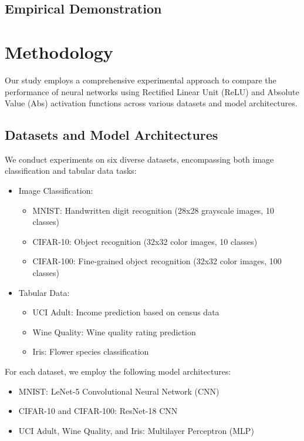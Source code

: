 \documentclass[11pt]{article}
\begin{document}
\subsection{Empirical Demonstration}



\section{Methodology}

Our study employs a comprehensive experimental approach to compare the performance of neural networks using Rectified Linear Unit (ReLU) and Absolute Value (Abs) activation functions across various datasets and model architectures.

\subsection{Datasets and Model Architectures}
We conduct experiments on six diverse datasets, encompassing both image classification and tabular data tasks:

\begin{itemize}
\item Image Classification:

\begin{itemize}
\item MNIST: Handwritten digit recognition (28x28 grayscale images, 10 classes)
\item CIFAR-10: Object recognition (32x32 color images, 10 classes)
\item CIFAR-100: Fine-grained object recognition (32x32 color images, 100 classes)
\end{itemize}

\item Tabular Data:

\begin{itemize}
\item UCI Adult: Income prediction based on census data
\item Wine Quality: Wine quality rating prediction
\item Iris: Flower species classification
\end{itemize}

\end{itemize}

For each dataset, we employ the following model architectures:

\begin{itemize}
\item MNIST: LeNet-5 Convolutional Neural Network (CNN)
\item CIFAR-10 and CIFAR-100: ResNet-18 CNN
\item UCI Adult, Wine Quality, and Iris: Multilayer Perceptron (MLP)
\end{itemize}
\end{document}
